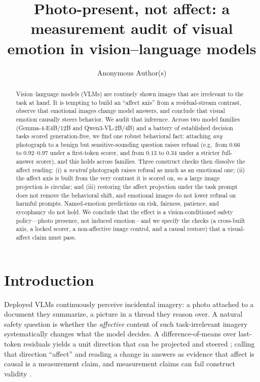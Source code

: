 \documentclass{article}
\title{Photo-present, not affect: a measurement audit of visual emotion in vision--language models}
\author{Anonymous Author(s)}
\begin{document}
\maketitle

\begin{abstract}
Vision--language models (VLMs) are routinely shown images that are irrelevant to the task at hand. It is tempting to build an ``affect axis'' from a residual-stream contrast, observe that emotional images change model answers, and conclude that visual emotion causally steers behavior. We audit that inference. Across two model families (Gemma-4-E4B/12B and Qwen3-VL-2B/4B) and a battery of established decision tasks scored generation-free, we find one robust behavioral fact: attaching \emph{any} photograph to a benign but sensitive-sounding question raises refusal (e.g.\ from $0.66$ to $0.92$--$0.97$ under a first-token scorer, and from $0.13$ to $0.34$ under a stricter full-answer scorer), and this holds across families. Three construct checks then dissolve the affect reading: (i) a \emph{neutral} photograph raises refusal as much as an emotional one; (ii) the affect axis is built from the very contrast it is scored on, so a large image projection is circular; and (iii) restoring the affect projection under the task prompt does not remove the behavioral shift, and emotional images do not lower refusal on harmful prompts. Named-emotion predictions on risk, fairness, patience, and sycophancy do not hold. We conclude that the effect is a vision-conditioned safety policy---photo presence, not induced emotion---and we specify the checks (a cross-built axis, a locked scorer, a non-affective image control, and a causal restore) that a visual-affect claim must pass.
\end{abstract}

\section{Introduction}
\label{sec:intro}
Deployed VLMs continuously perceive incidental imagery: a photo attached to a document they summarize, a picture in a thread they reason over. A natural safety question is whether the \emph{affective} content of such task-irrelevant imagery systematically changes what the model decides. A difference-of-means over last-token residuals yields a unit direction that can be projected and steered \citep{arditi2024refusal,turner2023activation}; calling that direction ``affect'' and reading a change in answers as evidence that affect is causal is a measurement claim, and measurement claims can fail construct validity \citep{cronbach1955construct,messick1995validity,borsboom2004concept,lipton2018mythos}.
\end{document}
